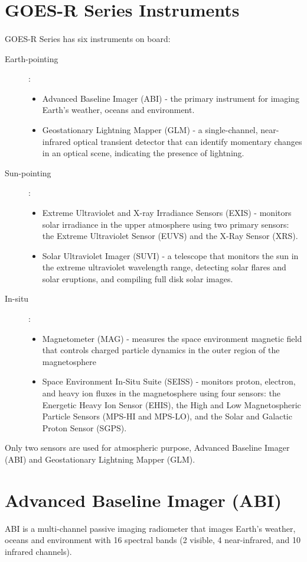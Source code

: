 \section{GOES-R Series Instruments}
\paragraph{}
GOES-R Series has six instruments on board:
\begin{description}
\item[Earth-pointing] : 
\begin{itemize} 
\item Advanced Baseline Imager (ABI) - the primary instrument for imaging Earth’s weather, oceans and environment.
\item Geostationary Lightning Mapper (GLM) - a single-channel, near-infrared optical transient detector that can identify momentary changes in an optical scene, indicating the presence of lightning.
\end{itemize}
\item[Sun-pointing] : 
\begin{itemize} 
\item Extreme Ultraviolet and X-ray Irradiance Sensors (EXIS) - monitors solar irradiance in the upper atmosphere using two primary sensors: the Extreme Ultraviolet Sensor (EUVS) and the X-Ray Sensor (XRS).
\item  Solar Ultraviolet Imager (SUVI) - a telescope that monitors the sun in the extreme ultraviolet wavelength range, detecting solar flares and solar eruptions, and compiling full disk solar images.
\end{itemize}
\item[In-situ] : 
\begin{itemize} 
\item Magnetometer (MAG) - measures the space environment magnetic field that controls charged particle dynamics in the outer region of the magnetosphere
\item Space Environment In-Situ Suite (SEISS) - monitors proton, electron, and heavy ion fluxes in the magnetosphere using four sensors: the Energetic Heavy Ion Sensor (EHIS), the High and Low Magnetospheric Particle Sensors (MPS-HI and MPS-LO), and the Solar and Galactic Proton Sensor (SGPS).
\end{itemize}
\end{description}
Only two sensors are used for atmospheric purpose, Advanced Baseline Imager (ABI) and Geostationary Lightning Mapper (GLM).
\newpage
\section{Advanced Baseline Imager (ABI)}
ABI is a multi-channel passive imaging radiometer that images Earth’s weather, oceans and environment with 16 spectral bands (2 visible, 4 near-infrared, and 10 infrared channels).

